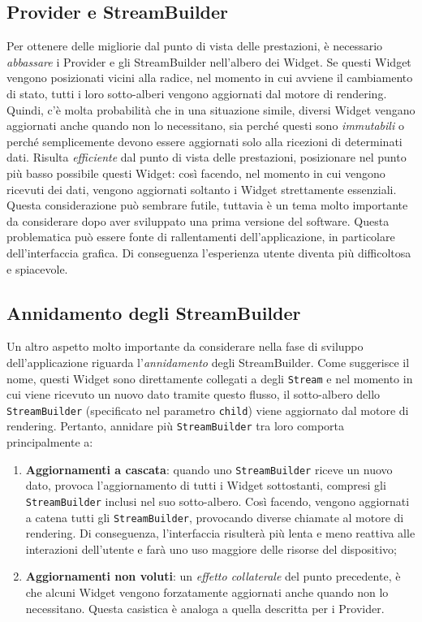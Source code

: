 \subsection{Provider e StreamBuilder}
Per ottenere delle migliorie dal punto di vista delle prestazioni, è necessario \textit{abbassare} i Provider e gli StreamBuilder nell'albero dei Widget. Se questi Widget vengono posizionati vicini alla radice, nel momento in cui avviene il cambiamento di stato, tutti i loro sotto-alberi vengono aggiornati dal motore di rendering. Quindi, c'è molta probabilità che in una situazione simile, diversi Widget vengano aggiornati anche quando non lo necessitano, sia perché questi sono \textit{immutabili} o perché semplicemente devono essere aggiornati solo alla ricezioni di determinati dati. Risulta \textit{efficiente} dal punto di vista delle prestazioni, posizionare nel punto più basso possibile questi Widget: così facendo, nel momento in cui vengono ricevuti dei dati, vengono aggiornati soltanto i Widget strettamente essenziali. Questa considerazione può sembrare futile, tuttavia è un tema molto importante da considerare dopo aver sviluppato una prima versione del software. Questa problematica può essere fonte di rallentamenti dell'applicazione, in particolare dell'interfaccia grafica. Di conseguenza l'esperienza utente diventa più difficoltosa e spiacevole.

\subsection{Annidamento degli StreamBuilder}
Un altro aspetto molto importante da considerare nella fase di sviluppo dell'applicazione riguarda l'\textit{annidamento} degli StreamBuilder. Come suggerisce il nome, questi Widget sono direttamente collegati a degli \verb|Stream| e nel momento in cui viene ricevuto un nuovo dato tramite questo flusso, il sotto-albero dello \verb|StreamBuilder| (specificato nel parametro \verb|child|) viene aggiornato dal motore di rendering. Pertanto, annidare più \verb|StreamBuilder| tra loro comporta principalmente a:
\begin{enumerate}
	\item \textbf{Aggiornamenti a cascata}: quando uno \verb|StreamBuilder| riceve un nuovo dato, provoca l'aggiornamento di tutti i Widget sottostanti, compresi gli \verb|StreamBuilder| inclusi nel suo sotto-albero. Così facendo, vengono aggiornati a catena tutti gli \verb|StreamBuilder|, provocando diverse chiamate al motore di rendering. Di conseguenza, l'interfaccia risulterà più lenta e meno reattiva alle interazioni dell'utente e farà uno uso maggiore delle risorse del dispositivo;
	\item \textbf{Aggiornamenti non voluti}: un \textit{effetto collaterale} del punto precedente, è che alcuni Widget vengono forzatamente aggiornati anche quando non lo necessitano. Questa casistica è analoga a quella descritta per i Provider.
\end{enumerate}

